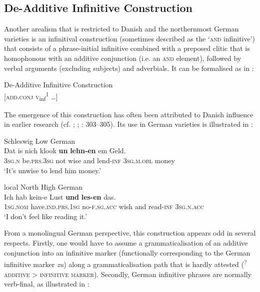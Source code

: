 \documentclass[output=paper]{langsci/langscibook}
\begin{document}
 
 \subsection{De-Additive Infinitive Construction}\label{sec:hoeder:4.3}



Another arealism that is restricted to Danish and the northernmost German varieties is an infinitival construction (sometimes described as the ‘\textsc{and} infinitive’) that consists of a phrase-initial infinitive combined with a preposed clitic that is homophonous with an additive conjunction (i.e. an \textsc{and} element), followed by verbal arguments (excluding subjects) and adverbials. It can be formalised as in :





\ea
	\label{ex:hoeder:6}
	De-Additive Infinitive Construction\\
       {[}\textsc{add.conj} \textsc{v}\textsubscript{inf}\textsuperscript{1} …{]}
     \z
       
The emergence of this construction has often been attributed to Danish influence in earlier research (cf. \citealt{Laur.1975}; \citealt{Hoekstra.2009}; \citealt{Hoder.2016b}: 303--305). Its use in German varieties is illustrated in :

 
\ea\label{ex:hoeder:7}
	\ea\label{ex:hoeder:7a}
 	 Schleswig Low German\\
	\gll Dat is nich{} klook \textbf{un} \textbf{lehn-en} em Geld.\\
     {\textsc{3sg.n}} be.\textsc{prs.3sg} not wise and lend-\textsc{inf} \textsc{3sg.m.obl} money\\
	\glt `It’s unwise to lend him money.'

	\ex\label{ex:hoeder:7b}
		local North High German\\
	\gll Ich hab{} kein-e Lust \textbf{und} \textbf{les-en} das.\\
     1\textsc{sg.nom} have.\textsc{ind.prs.}1\textsc{sg} no-\textsc{f.sg.acc} wish and read-\textsc{inf} 3\textsc{sg.n.acc}\\
	\glt `I don’t feel like reading it.'
\z
\z

From a monolingual German perspective, this construction appears odd in several respects. Firstly, one would have to assume a grammaticalisation of an additive conjunction into an infinitive marker (functionally corresponding to the German infinitive marker \textit{zu}) along a grammaticalisation path that is hardly attested (\textsuperscript{?}\textsc{additive} > \textsc{infinitive} \textsc{marker}). Secondly, German infinitive phrases are normally verb-final, as illustrated in :
\end{document}
